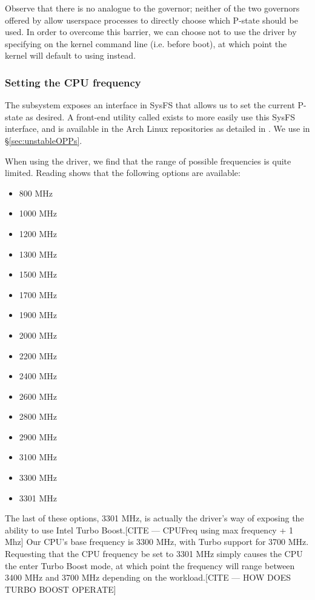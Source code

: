 Observe that there is no analogue to the  governor; neither of
the two governors offered by  allow userspace processes to
directly choose which P-state should be used. In order to overcome this barrier,
we can choose not to use the  driver by specifying
 on the kernel command line (i.e. before boot),
at which point the kernel will default to using  instead.

\subsubsection{Setting the CPU frequency}
\label{sec:cpupower}

The  subsystem exposes an interface in SysFS that allows us to
set the current P-state as desired. A front-end utility called 
exists to more easily use this SysFS interface, and is available in the Arch
Linux repositories as detailed in \cite{archFrequency}. We use 
in §\ref{sec:unstableOPPs}.

When using the  driver, we find that the range of possible
frequencies is quite limited. Reading  shows that the
following options are available:
\begin{itemize}
    \item 800 MHz
    \item 1000 MHz
    \item 1200 MHz
    \item 1300 MHz
    \item 1500 MHz
    \item 1700 MHz
    \item 1900 MHz
    \item 2000 MHz
    \item 2200 MHz
    \item 2400 MHz
    \item 2600 MHz
    \item 2800 MHz
    \item 2900 MHz
    \item 3100 MHz
    \item 3300 MHz
    \item 3301 MHz
\end{itemize}

The last of these options, 3301 MHz, is actually the driver's way of exposing
the ability to use Intel Turbo Boost.[CITE — CPUFreq using max frequency + 1 Mhz]
Our CPU's base frequency is 3300 MHz,
with Turbo support for 3700 MHz. Requesting that the CPU frequency be set to
3301 MHz simply causes the CPU the enter Turbo Boost mode, at which point the
frequency will range between 3400 MHz and 3700 MHz depending on the
workload.[CITE — HOW DOES TURBO BOOST OPERATE]
